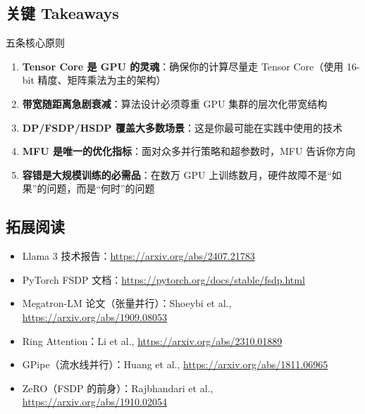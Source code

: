 \subsection{关键 Takeaways}

\begin{importantbox}{五条核心原则}
\begin{enumerate}
    \item \textbf{Tensor Core 是 GPU 的灵魂}：确保你的计算尽量走 Tensor Core（使用 16-bit 精度、矩阵乘法为主的架构）
    \item \textbf{带宽随距离急剧衰减}：算法设计必须尊重 GPU 集群的层次化带宽结构
    \item \textbf{DP/FSDP/HSDP 覆盖大多数场景}：这是你最可能在实践中使用的技术
    \item \textbf{MFU 是唯一的优化指标}：面对众多并行策略和超参数时，MFU 告诉你方向
    \item \textbf{容错是大规模训练的必需品}：在数万 GPU 上训练数月，硬件故障不是``如果''的问题，而是``何时''的问题
\end{enumerate}
\end{importantbox}

\subsection{拓展阅读}

\begin{itemize}
    \item Llama 3 技术报告：\url{https://arxiv.org/abs/2407.21783}
    \item PyTorch FSDP 文档：\url{https://pytorch.org/docs/stable/fsdp.html}
    \item Megatron-LM 论文（张量并行）：Shoeybi et al., \url{https://arxiv.org/abs/1909.08053}
    \item Ring Attention：Li et al., \url{https://arxiv.org/abs/2310.01889}
    \item GPipe（流水线并行）：Huang et al., \url{https://arxiv.org/abs/1811.06965}
    \item ZeRO（FSDP 的前身）：Rajbhandari et al., \url{https://arxiv.org/abs/1910.02054}
\end{itemize}


